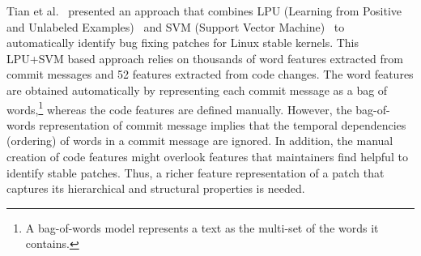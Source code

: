 

Tian et al.~\cite{tian2012identifying} presented an approach that combines LPU (Learning from Positive and Unlabeled Examples)~\cite{letouzey2000learning} and SVM (Support Vector Machine)~\cite{suykens1999least} to automatically identify bug fixing patches for Linux stable kernels. 
This LPU+SVM based approach relies on thousands of word features extracted from commit messages and 52 features extracted from code changes. The word features are obtained automatically by representing each commit message as a bag of words,\footnote{A bag-of-words model represents a text as the multi-set of the words it contains.} whereas the code features are defined manually. However, the bag-of-words representation of commit message implies that the temporal dependencies (ordering) of words in a commit message are ignored. In addition, the manual creation of code features might overlook features that maintainers find helpful to identify stable patches. Thus, a richer feature representation of a patch that captures its hierarchical and structural properties is needed.  

